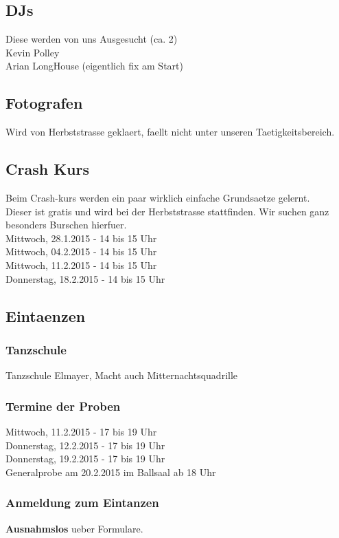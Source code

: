 \documentclass[12pt]{article}
\begin{document}
\subsection{DJs}
Diese werden von uns Ausgesucht (ca. 2) \\
Kevin Polley \\
Arian LongHouse (eigentlich fix am Start) 
\subsection{Fotografen}
Wird von Herbststrasse geklaert, faellt nicht unter unseren Taetigkeitsbereich.
\subsection{Crash Kurs}
Beim Crash-kurs werden ein paar wirklich einfache Grundsaetze gelernt.
\\
Dieser ist gratis und wird bei der Herbststrasse stattfinden. Wir suchen ganz besonders Burschen hierfuer. \\
Mittwoch, 28.1.2015 - 14 bis 15 Uhr \\ 
Mittwoch, 04.2.2015 - 14 bis 15 Uhr \\ 
Mittwoch, 11.2.2015 - 14 bis 15 Uhr \\
Donnerstag, 18.2.2015 - 14 bis 15 Uhr 
\subsection{Eintaenzen}
\subsubsection{Tanzschule}
Tanzschule Elmayer, Macht auch Mitternachtsquadrille
\subsubsection{Termine der Proben}
Mittwoch, 11.2.2015 - 17 bis 19 Uhr \\ 
Donnerstag, 12.2.2015 - 17 bis 19 Uhr \\
Donnerstag, 19.2.2015 - 17 bis 19 Uhr \\
Generalprobe am 20.2.2015 im Ballsaal ab 18 Uhr
\subsubsection{Anmeldung zum Eintanzen}
\textbf{Ausnahmslos} ueber Formulare.
\end{document}

